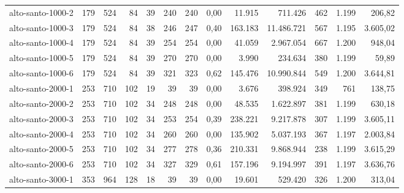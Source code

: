 \begin{table}[ht!]
{\begin{tabular}{lrrrrrrrrrrrr}
			\rowcolor{rowgrey}alto-santo-1000-2                                                       & 179   & 524   & 84  & 39 & 240 & 240 & 0,00  & 11.915  & 711.426    & 462   & 1.199 & 206,82   \\
			\rowcolor{rowlight}alto-santo-1000-3                                                      & 179   & 524   & 84  & 38 & 246 & 247 & 0,40  & 163.183 & 11.486.721 & 567   & 1.195 & 3.605,02 \\
			\rowcolor{rowgrey}alto-santo-1000-4                                                       & 179   & 524   & 84  & 39 & 254 & 254 & 0,00  & 41.059  & 2.967.054  & 667   & 1.200 & 948,04   \\
			\rowcolor{rowgrey}alto-santo-1000-5                                                       & 179   & 524   & 84  & 39 & 270 & 270 & 0,00  & 3.990   & 234.634    & 380   & 1.199 & 59,89    \\
			\rowcolor{rowlight}alto-santo-1000-6                                                      & 179   & 524   & 84  & 39 & 321 & 323 & 0,62  & 145.476 & 10.990.844 & 549   & 1.200 & 3.644,81 \\
			\rowcolor{rowgrey}alto-santo-2000-1                                                       & 253   & 710   & 102 & 19 & 39  & 39  & 0,00  & 3.676   & 398.924    & 349   & 761   & 138,75   \\
			\rowcolor{rowgrey}alto-santo-2000-2                                                       & 253   & 710   & 102 & 34 & 248 & 248 & 0,00  & 48.535  & 1.622.897  & 381   & 1.199 & 630,18   \\
			\rowcolor{rowlight}alto-santo-2000-3                                                      & 253   & 710   & 102 & 34 & 253 & 254 & 0,39  & 238.221 & 9.217.878  & 307   & 1.199 & 3.605,11 \\
			\rowcolor{rowgrey}alto-santo-2000-4                                                       & 253   & 710   & 102 & 34 & 260 & 260 & 0,00  & 135.902 & 5.037.193  & 367   & 1.197 & 2.003,84 \\
			\rowcolor{rowlight}alto-santo-2000-5                                                      & 253   & 710   & 102 & 34 & 277 & 278 & 0,36  & 210.331 & 9.868.944  & 238   & 1.199 & 3.615,29 \\
			\rowcolor{rowlight}alto-santo-2000-6                                                      & 253   & 710   & 102 & 34 & 327 & 329 & 0,61  & 157.196 & 9.194.997  & 391   & 1.197 & 3.636,76 \\
			\rowcolor{rowgrey}alto-santo-3000-1                                                       & 353   & 964   & 128 & 18 & 39  & 39  & 0,00  & 19.601  & 529.420    & 326   & 1.200 & 313,04   \\

\end{tabular}}
\end{table}
